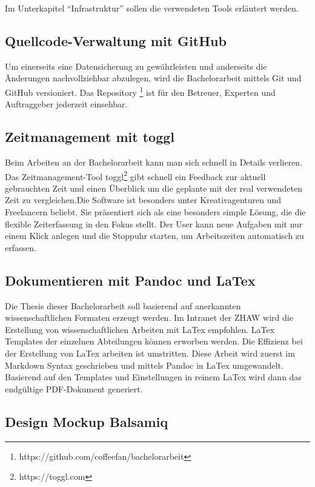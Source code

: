 Im Unterkapitel ``Infrastruktur'' sollen die verwendeten Tools erläutert
werden.

\subsection{Quellcode-Verwaltung mit
GitHub}\label{quellcode-verwaltung-mit-github}

Um einerseits eine Datensicherung zu gewährleisten und anderseits die
Änderungen nachvollziehbar abzulegen, wird die Bachelorarbeit mittels
Git und GitHub versioniert. Das Repository \footnote{https://github.com/coffeefan/bachelorarbeit}
ist für den Betreuer, Experten und Auftraggeber jederzeit einsehbar.

\subsection{Zeitmanagement mit toggl}\label{zeitmanagement-mit-toggl}

Beim Arbeiten an der Bachelorarbeit kann man sich schnell in Details
verlieren. Das Zeitmanagement-Tool toggl\footnote{https://toggl.com}
gibt schnell ein Feedback zur aktuell gebrauchten Zeit und einen
Überblick um die geplante mit der real verwendeten Zeit zu
vergleichen.Die Software ist besonders unter Kreativagenturen und
Freelancern beliebt. Sie präsentiert sich als eine besonders simple
Lösung, die die flexible Zeiterfassung in den Fokus stellt. Der User
kann neue Aufgaben mit nur einem Klick anlegen und die Stoppuhr starten,
um Arbeitszeiten automatisch zu erfassen.

\subsection{Dokumentieren mit Pandoc und
LaTex}\label{dokumentieren-mit-pandoc-und-latex}

Die Thesis dieser Bachelorarbeit soll basierend auf anerkannten
wissenschaftlichen Formaten erzeugt werden. Im Intranet der ZHAW wird
die Erstellung von wissenschaftlichen Arbeiten mit LaTex empfohlen.
LaTex Templates der einzelnen Abteilungen können erworben werden. Die
Effizienz bei der Erstellung von LaTex arbeiten ist umstritten. Diese
Arbeit wird zuerst im Markdown Syntax geschrieben und mittels Pandoc in
LaTex umgewandelt. Basierend auf den Templates und Einstellungen in
reinem LaTex wird dann das endgültige PDF-Dokument generiert.

\subsection{Design Mockup Balsamiq}\label{design-mockup-balsamiq}

